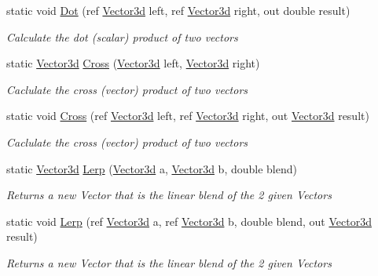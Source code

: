 \begin{DoxyCompactItemize}
static void \hyperlink{struct_open_t_k_1_1_vector3d_a9e94fbdfa30466c8846baf0027e19e13}{Dot} (ref \hyperlink{struct_open_t_k_1_1_vector3d}{Vector3d} left, ref \hyperlink{struct_open_t_k_1_1_vector3d}{Vector3d} right, out double result)
\begin{DoxyCompactList}\small\item\em Calculate the dot (scalar) product of two vectors \end{DoxyCompactList}\item 
static \hyperlink{struct_open_t_k_1_1_vector3d}{Vector3d} \hyperlink{struct_open_t_k_1_1_vector3d_afae6501c77bff8155399399d14852813}{Cross} (\hyperlink{struct_open_t_k_1_1_vector3d}{Vector3d} left, \hyperlink{struct_open_t_k_1_1_vector3d}{Vector3d} right)
\begin{DoxyCompactList}\small\item\em Caclulate the cross (vector) product of two vectors \end{DoxyCompactList}\item 
static void \hyperlink{struct_open_t_k_1_1_vector3d_ac0c6f9e6851a01b794c5c0c299ef2673}{Cross} (ref \hyperlink{struct_open_t_k_1_1_vector3d}{Vector3d} left, ref \hyperlink{struct_open_t_k_1_1_vector3d}{Vector3d} right, out \hyperlink{struct_open_t_k_1_1_vector3d}{Vector3d} result)
\begin{DoxyCompactList}\small\item\em Caclulate the cross (vector) product of two vectors \end{DoxyCompactList}\item 
static \hyperlink{struct_open_t_k_1_1_vector3d}{Vector3d} \hyperlink{struct_open_t_k_1_1_vector3d_ad83b3030cfda37a4c06348fedbc65ff0}{Lerp} (\hyperlink{struct_open_t_k_1_1_vector3d}{Vector3d} a, \hyperlink{struct_open_t_k_1_1_vector3d}{Vector3d} b, double blend)
\begin{DoxyCompactList}\small\item\em Returns a new Vector that is the linear blend of the 2 given Vectors \end{DoxyCompactList}\item 
static void \hyperlink{struct_open_t_k_1_1_vector3d_a9a6222623dade122dbd385514490f196}{Lerp} (ref \hyperlink{struct_open_t_k_1_1_vector3d}{Vector3d} a, ref \hyperlink{struct_open_t_k_1_1_vector3d}{Vector3d} b, double blend, out \hyperlink{struct_open_t_k_1_1_vector3d}{Vector3d} result)
\begin{DoxyCompactList}\small\item\em Returns a new Vector that is the linear blend of the 2 given Vectors \end{DoxyCompactList}\item 

\end{DoxyCompactItemize}

